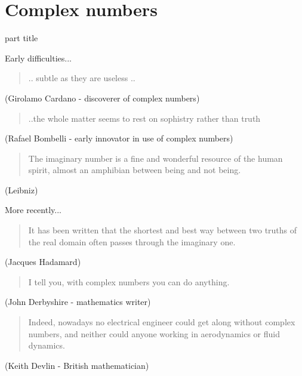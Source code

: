 \documentclass{beamer}
\begin{document}
\section{Complex numbers}

\begin{frame}
\begin{beamercolorbox}[sep=12pt,center]{part title}
\insertsection\par
\end{beamercolorbox}
\end{frame}

\begin{frame}{Early difficulties...}

\begin{quote}
.. subtle as they are useless ..
\end{quote}
(Girolamo Cardano - discoverer of complex numbers)
\vfill

\begin{quote}
..the whole matter seems to rest on sophistry rather than truth
\end{quote}
(Rafael Bombelli - early innovator in use of complex numbers)
\vfill

\begin{quote}
The imaginary number is a fine and wonderful resource of the human spirit, almost an amphibian between being and not being.
\end{quote}
(Leibniz)
\end{frame}

\begin{frame}{More recently...}
\begin{quote}
It has been written that the shortest and best way between two truths of the real domain often passes through the imaginary one.
\end{quote}
(Jacques Hadamard)
\vfill

\begin{quote}
I tell you, with complex numbers you can do anything.
\end{quote}
(John Derbyshire - mathematics writer)
\vfill

\begin{quote}
Indeed, nowadays no electrical engineer could get along without complex numbers, and neither could anyone working in aerodynamics or fluid dynamics.
\end{quote}
(Keith Devlin - British mathematician)
\end{frame}
\end{document}
